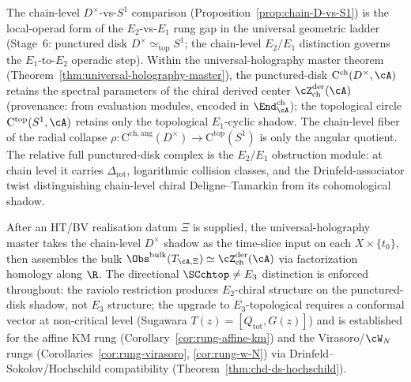 \begin{remark}
\label{rem:raviolo-restriction-holography-anchor}%
%
The chain-level $D^\times$-vs-$S^1$ comparison
(Proposition~\ref{prop:chain-D-vs-S1}) is the local-operad
form of the $E_2$-vs-$E_1$ rung gap in the universal
geometric ladder (Stage~6: punctured disk
$D^\times \simeq_{\mathrm{top}} S^1$; the chain-level $E_2/E_1$
distinction governs the $E_1$-to-$E_2$ operadic step).
Within the universal-holography master theorem
(Theorem~\ref{thm:universal-holography-master}), the punctured-disk
$\mathrm{C}^{\mathrm{ch}}(D^\times, \cA)$ retains the spectral
parameters of the chiral derived center
$\cZ^{\mathrm{der}}_{\mathrm{ch}}(\cA)$ (provenance: from evaluation
modules, encoded in $\End^{\mathrm{ch}}_\cA$); the topological circle
$\mathrm{C}^{\mathrm{top}}(S^1, \cA)$ retains only the topological
$E_1$-cyclic shadow. The chain-level fiber of the radial collapse
$\rho\colon \mathrm{C}^{\mathrm{ch,ang}}(D^\times) \to \mathrm{C}^{\mathrm{top}}(S^1)$
is only the angular quotient. The relative full punctured-disk complex is
the $E_2/E_1$ obstruction module: at chain level it carries
\(\Delta_{\mathrm{rot}}\), logarithmic collision classes, and the
Drinfeld-associator twist distinguishing chain-level chiral
Deligne--Tamarkin from its cohomological shadow.

After an HT/BV realisation datum $\Xi$ is supplied, the
universal-holography master takes the chain-level $D^\times$
shadow as the time-slice input on each $X \times \{t_0\}$, then
assembles the bulk $\Obs^{\mathrm{bulk}}(T_{\cA,\Xi}) \simeq
\cZ^{\mathrm{der}}_{\mathrm{ch}}(\cA)$ via factorization homology
along $\R$. The directional $\SCchtop \neq E_3$ distinction is
enforced throughout: the raviolo restriction produces $E_2$-chiral
structure on the punctured-disk shadow, not $E_3$ structure; the
upgrade to $E_3$-topological requires a conformal vector at
non-critical level (Sugawara $T(z) = [Q_{\mathrm{tot}}, G(z)]$) and
is established for the affine KM rung
(Corollary~\ref{cor:rung-affine-km}) and the Virasoro/$\cW_N$ rungs
(Corollaries~\ref{cor:rung-virasoro}, \ref{cor:rung-w-N}) via
Drinfeld--Sokolov/Hochschild compatibility
(Theorem~\ref{thm:chd-ds-hochschild}).
\end{remark}
